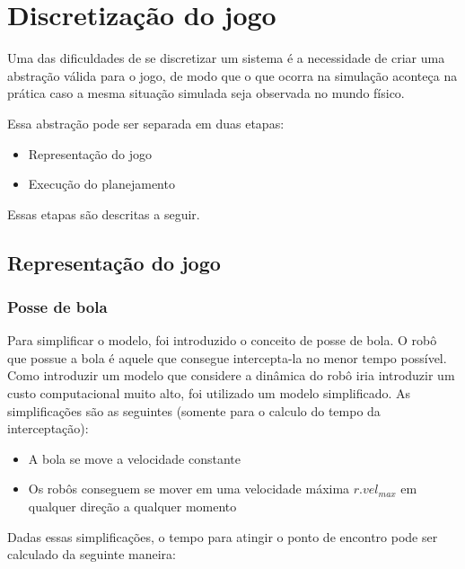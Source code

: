 \section{Discretização do jogo}\label{sec:mapeamento}

Uma das dificuldades de se discretizar um sistema é a necessidade de criar uma
abstração válida para o jogo, de modo que o que ocorra na simulação aconteça na
prática caso a mesma situação simulada seja observada no mundo físico.

Essa abstração pode ser separada em duas etapas:

\begin{itemize}
  \item Representação do jogo
  \item Execução do planejamento
\end{itemize}

Essas etapas são descritas a seguir.

\subsection{Representação do jogo}\label{subsec:repres_jogo}

\subsubsection{Posse de bola}

Para simplificar o modelo, foi introduzido o conceito de posse
de bola. O robô que possue a bola é aquele que consegue intercepta-la
no menor tempo possível. Como introduzir um modelo que considere
a dinâmica do robô iria introduzir um custo computacional muito alto,
foi utilizado um modelo simplificado. As simplificações são as
seguintes (somente para o calculo do tempo da interceptação):

\begin{itemize}
  \item A bola se move a velocidade constante
  \item Os robôs conseguem se mover em uma velocidade máxima
        $r.vel_{max}$ em qualquer direção a qualquer momento
\end{itemize}

Dadas essas simplificações, o tempo para atingir o ponto de
encontro pode ser calculado da seguinte maneira: 

